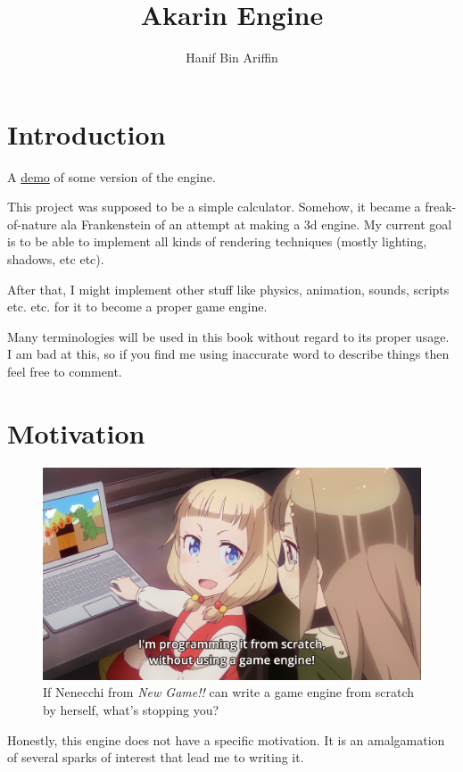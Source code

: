 \documentclass[a4paper,14pt]{extbook}
\title{Akarin Engine}
\author{Hanif Bin Ariffin}
\begin{document}
\maketitle
\tableofcontents

\newpage
\section{Introduction}

A \href{https://www.youtube.com/watch?v=BbLW4ZJnaLM}{demo} of some version of the engine.

This project was supposed to be a simple calculator.
Somehow, it became a freak-of-nature ala Frankenstein of an attempt at making a 3d engine.
My current goal is to be able to implement all kinds of rendering techniques (mostly lighting, shadows, etc etc).

After that, I might implement other stuff like physics, animation, sounds, scripts etc. etc. for it to become a proper game engine.

Many terminologies will be used in this book without regard to its proper usage.
I am bad at this, so if you find me using inaccurate word to describe things then feel free to comment.

\newpage
\section{Motivation}

\begin{figure}[h]
\includegraphics[width=\textwidth]{.images/nenechi_writes_game_engine.png}
\caption{If Nenecchi from \textit{New Game!!} can write a game engine from scratch by herself, what's stopping you?}
\end{figure}

Honestly, this engine does not have a specific motivation.
It is an amalgamation of several sparks of interest that lead me to writing it.
\end{document}
